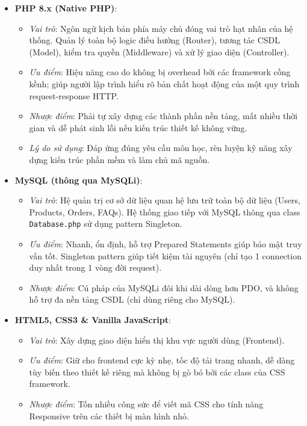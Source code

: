 \documentclass[pt = 12,a4paper]{article}
\begin{document}
\begin{itemize}
    \item \textbf{PHP 8.x (Native PHP)}: 
    \begin{itemize}
        \item \textit{Vai trò}: Ngôn ngữ kịch bản phía máy chủ đóng vai trò hạt nhân của hệ thống. Quản lý toàn bộ logic điều hướng (Router), tương tác CSDL (Model), kiểm tra quyền (Middleware) và xử lý giao diện (Controller).
        \item \textit{Ưu điểm}: Hiệu năng cao do không bị overhead bởi các framework cồng kềnh; giúp người lập trình hiểu rõ bản chất hoạt động của một quy trình request-response HTTP.
        \item \textit{Nhược điểm}: Phải tự xây dựng các thành phần nền tảng, mất nhiều thời gian và dễ phát sinh lỗi nếu kiến trúc thiết kế không vững.
        \item \textit{Lý do sử dụng}: Đáp ứng đúng yêu cầu môn học, rèn luyện kỹ năng xây dựng kiến trúc phần mềm và làm chủ mã nguồn.
    \end{itemize}

    \item \textbf{MySQL (thông qua MySQLi)}:
    \begin{itemize}
        \item \textit{Vai trò}: Hệ quản trị cơ sở dữ liệu quan hệ lưu trữ toàn bộ dữ liệu (Users, Products, Orders, FAQs). Hệ thống giao tiếp với MySQL thông qua class \texttt{Database.php} sử dụng pattern Singleton.
        \item \textit{Ưu điểm}: Nhanh, ổn định, hỗ trợ Prepared Statements giúp bảo mật truy vấn tốt. Singleton pattern giúp tiết kiệm tài nguyên (chỉ tạo 1 connection duy nhất trong 1 vòng đời request).
        \item \textit{Nhược điểm}: Cú pháp của MySQLi đôi khi dài dòng hơn PDO, và không hỗ trợ đa nền tảng CSDL (chỉ dùng riêng cho MySQL).
    \end{itemize}

    \item \textbf{HTML5, CSS3 \& Vanilla JavaScript}:
    \begin{itemize}
        \item \textit{Vai trò}: Xây dựng giao diện hiển thị khu vực người dùng (Frontend).
        \item \textit{Ưu điểm}: Giữ cho frontend cực kỳ nhẹ, tốc độ tải trang nhanh, dễ dàng tùy biến theo thiết kế riêng mà không bị gò bó bởi các class của CSS framework.
        \item \textit{Nhược điểm}: Tốn nhiều công sức để viết mã CSS cho tính năng Responsive trên các thiết bị màn hình nhỏ.
    \end{itemize}


\end{itemize}
\end{document}
